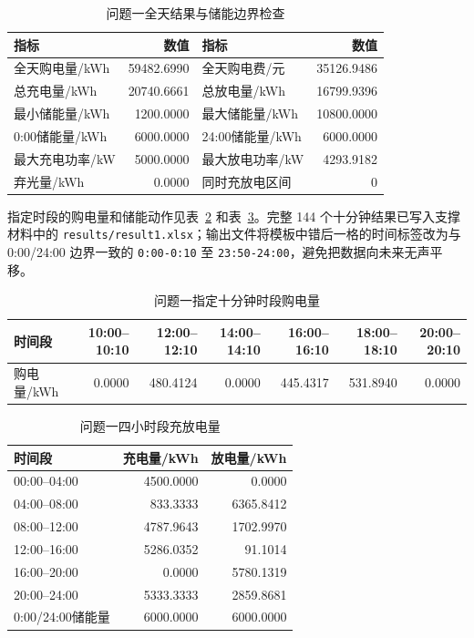 \documentclass[withoutpreface]{cumcmthesis}
\begin{document}
\begin{table}[H]
\centering
\caption{问题一全天结果与储能边界检查}\label{tab:q1summary}
\begin{tabular}{l r l r}
\toprule
指标 & 数值 & 指标 & 数值\\
\midrule
全天购电量/kWh & 59482.6990 & 全天购电费/元 & 35126.9486\\
总充电量/kWh & 20740.6661 & 总放电量/kWh & 16799.9396\\
最小储能量/kWh & 1200.0000 & 最大储能量/kWh & 10800.0000\\
0:00储能量/kWh & 6000.0000 & 24:00储能量/kWh & 6000.0000\\
最大充电功率/kW & 5000.0000 & 最大放电功率/kW & 4293.9182\\
弃光量/kWh & 0.0000 & 同时充放电区间 & 0\\
\bottomrule
\end{tabular}
\end{table}

指定时段的购电量和储能动作见表~\ref{tab:q1selected} 和表~\ref{tab:q1storage}。完整 144 个十分钟结果已写入支撑材料中的 \texttt{results/result1.xlsx}；输出文件将模板中错后一格的时间标签改为与 0:00/24:00 边界一致的 \texttt{0:00-0:10} 至 \texttt{23:50-24:00}，避免把数据向未来无声平移。

\begin{table}[H]
\centering
\caption{问题一指定十分钟时段购电量}\label{tab:q1selected}
\begin{tabular}{lrrrrrr}
\toprule
时间段 & 10:00--10:10 & 12:00--12:10 & 14:00--14:10 & 16:00--16:10 & 18:00--18:10 & 20:00--20:10\\
\midrule
购电量/kWh & 0.0000 & 480.4124 & 0.0000 & 445.4317 & 531.8940 & 0.0000\\
\bottomrule
\end{tabular}
\end{table}

\begin{table}[H]
\centering
\caption{问题一四小时段充放电量}\label{tab:q1storage}
\begin{tabular}{lrr}
\toprule
时间段 & 充电量/kWh & 放电量/kWh\\
\midrule
00:00--04:00 & 4500.0000 & 0.0000\\
04:00--08:00 & 833.3333 & 6365.8412\\
08:00--12:00 & 4787.9643 & 1702.9970\\
12:00--16:00 & 5286.0352 & 91.1014\\
16:00--20:00 & 0.0000 & 5780.1319\\
20:00--24:00 & 5333.3333 & 2859.8681\\
\midrule
0:00/24:00储能量 & 6000.0000 & 6000.0000\\
\bottomrule
\end{tabular}
\end{table}
\end{document}
